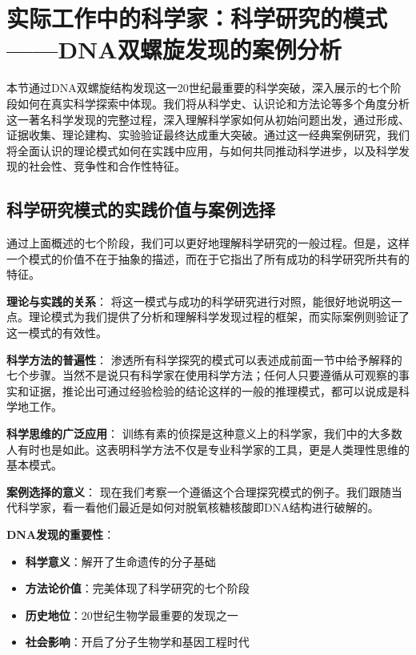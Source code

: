 \section{实际工作中的科学家：科学研究的模式——DNA双螺旋发现的案例分析}

\begin{logicbox}[title=引言]
本节通过DNA双螺旋结构发现这一20世纪最重要的科学突破，深入展示的七个阶段如何在真实科学探索中体现。我们将从科学史、认识论和方法论等多个角度分析这一著名科学发现的完整过程，深入理解科学家如何从初始问题出发，通过形成、证据收集、理论建构、实验验证最终达成重大突破。通过这一经典案例研究，我们将全面认识的理论模式如何在实践中应用，与如何共同推动科学进步，以及科学发现的社会性、竞争性和合作性特征。
\end{logicbox}

\subsection{科学研究模式的实践价值与案例选择}

\begin{theorembox}[title=科学研究模式的实践价值]
通过上面概述的七个阶段，我们可以更好地理解科学研究的一般过程。但是，这样一个模式的价值不在于抽象的描述，而在于它指出了所有成功的科学研究所共有的特征。

\textbf{理论与实践的关系}：
将这一模式与成功的科学研究进行对照，能很好地说明这一点。理论模式为我们提供了分析和理解科学发现过程的框架，而实际案例则验证了这一模式的有效性。

\textbf{科学方法的普遍性}：
渗透所有科学探究的模式可以表述成前面一节中给予解释的七个步骤。当然不是说只有科学家在使用科学方法；任何人只要遵循从可观察的事实和证据，推论出可通过经验检验的结论这样的一般的推理模式，都可以说成是科学地工作。

\textbf{科学思维的广泛应用}：
训练有素的侦探是这种意义上的科学家，我们中的大多数人有时也是如此。这表明科学方法不仅是专业科学家的工具，更是人类理性思维的基本模式。

\textbf{案例选择的意义}：
现在我们考察一个遵循这个合理探究模式的例子。我们跟随当代科学家，看一看他们最近是如何对脱氧核糖核酸即DNA结构进行破解的。\cite{watson1968}

\textbf{DNA发现的重要性}：
\begin{itemize}
\item \textbf{科学意义}：解开了生命遗传的分子基础
\item \textbf{方法论价值}：完美体现了科学研究的七个阶段
\item \textbf{历史地位}：20世纪生物学最重要的发现之一
\item \textbf{社会影响}：开启了分子生物学和基因工程时代
\end{itemize}
\end{theorembox}

